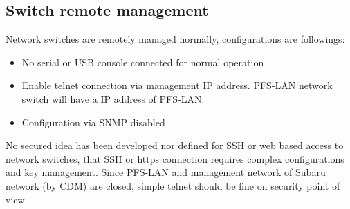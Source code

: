 \documentclass[a4paper,notitlepage]{article}
\begin{document}
\subsection{Switch remote management}

Network switches are remotely managed normally, configurations are followings: 

\begin{itemize}
  \item No serial or USB console connected for normal operation
  \item Enable telnet connection via management IP address. PFS-LAN network 
    switch will have a IP address of PFS-LAN.
  \item Configuration via SNMP disabled
\end{itemize}

No secured idea has been developed nor defined for SSH or web based access to 
network switches, that SSH or https connection requires complex configurations 
and key management. Since PFS-LAN and management network of Subaru network (by 
CDM) are closed, simple telnet should be fine on security point of view.
\end{document}
